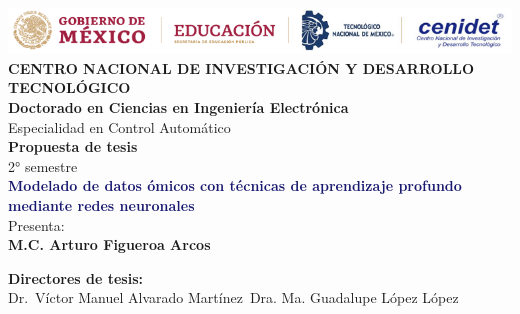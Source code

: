 \begin{titlepage}
    \begin{center}
        \noindent \includegraphics[width=\textwidth]{logos latex.PNG} \\[2cm] %
        \textbf{{\Huge CENTRO NACIONAL DE INVESTIGACIÓN Y DESARROLLO TECNOLÓGICO}}\\[1cm]
        
        \textbf{\Large{Doctorado en Ciencias en Ingeniería Electrónica}}\\
        {\large Especialidad en Control Automático}\\[1cm]
        
        \textbf{{\Large Propuesta de tesis}}\\
        {\large 2° semestre}\\[1cm]
              
        \textbf{\Large{\textcolor{MidnightBlue}{Modelado de datos ómicos con técnicas de aprendizaje profundo mediante redes neuronales}}}\\[1cm]
        
        {\large Presenta:}\\
        \textbf{{\Large M.C. Arturo Figueroa Arcos}}\\[1cm]
    
    \end{center}
    \begin{minipage}{0.46\textwidth}								
        \begin{flushleft}
        \begin{center}
    
            \textbf{Directores de tesis:}\\
        
            Dr.\ Víctor Manuel Alvarado Martínez\
            Dra. Ma. Guadalupe López López\\
            
    \end{center}
    \end{flushleft}
    \end{minipage}		
    \begin{minipage}{0.52\textwidth}		
    \vspace{0cm}
    \begin{flushright}															%
    \begin{center}
    

\end{center}
\end{flushright}
\end{minipage}
\end{titlepage}
